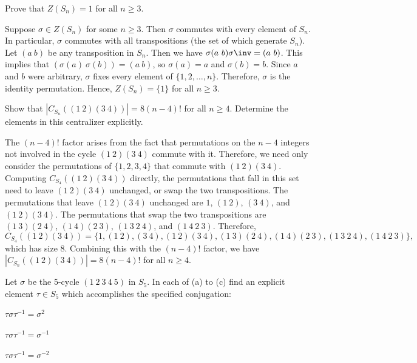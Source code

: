 \begin{exercise}
	Prove that $Z(S_n)=1$ for all $n \ge 3$.
\end{exercise}

\begin{sol}
	Suppose $\sigma \in Z(S_n)$ for some $n \geq 3$. Then $\sigma$ commutes with every element of $S_n$. In particular, $\sigma$ commutes with all transpositions (the set of which generate $S_n$). Let $(a\ b)$ be any transposition in $S_n$. Then we have $\sigma(a\ b)\sigma\inv = (a\ b)$. This implies that $(\sigma(a)\ \sigma(b)) = (a\ b)$, so $\sigma(a) = a$ and $\sigma(b) = b$. Since $a$ and $b$ were arbitrary, $\sigma$ fixes every element of $\{1, 2, \ldots, n\}$. Therefore, $\sigma$ is the identity permutation. Hence, $Z(S_n) = \{1\}$ for all $n \geq 3$.
\end{sol}

\begin{exercise}
	Show that $|C_{S_n}((1\ 2)(3\ 4))| = 8 (n-4)!$ for all $n \ge 4$. Determine the elements in this centralizer explicitly.
\end{exercise}

\begin{sol}
	The $(n - 4)!$ factor arises from the fact that permutations on the $n - 4$ integers not involved in the cycle $(1\ 2)(3\ 4)$ commute with it. Therefore, we need only consider the permutations of $\{1, 2, 3, 4\}$ that commute with $(1\ 2)(3\ 4)$. Computing $C_{S_4}((1\ 2)(3\ 4))$ directly, the permutations that fall in this set need to leave $(1\ 2)(3\ 4)$ unchanged, or swap the two transpositions. The permutations that leave $(1\ 2)(3\ 4)$ unchanged are $1$, $(1\ 2)$, $(3\ 4)$, and $(1\ 2)(3\ 4)$. The permutations that swap the two transpositions are $(1\ 3)(2\ 4)$, $(1\ 4)(2\ 3)$, $(1\ 3\ 2\ 4)$, and $(1\ 4\ 2\ 3)$. Therefore, 
	\[C_{S_4}((1\ 2)(3\ 4)) = \{1, (1\ 2), (3\ 4), (1\ 2)(3\ 4), (1\ 3)(2\ 4), (1\ 4)(2\ 3), (1\ 3\ 2\ 4), (1\ 4\ 2\ 3)\},\]
	which has size 8. Combining this with the $(n - 4)!$ factor, we have $|C_{S_n}((1\ 2)(3\ 4))| = 8(n - 4)!$ for all $n \geq 4$.
\end{sol}

\begin{exercise}
	Let $\sigma$ be the 5-cycle $(1\ 2\ 3\ 4\ 5)$ in $S_5$. In each of (a) to (c) find an explicit element $\tau \in S_5$ which accomplishes the specified conjugation:
	\begin{subproblems}
		\item $\tau \sigma \tau^{-1} = \sigma^2$
		\item $\tau \sigma \tau^{-1} = \sigma^{-1}$
		\item $\tau \sigma \tau^{-1} = \sigma^{-2}$
	\end{subproblems}
\end{exercise}

